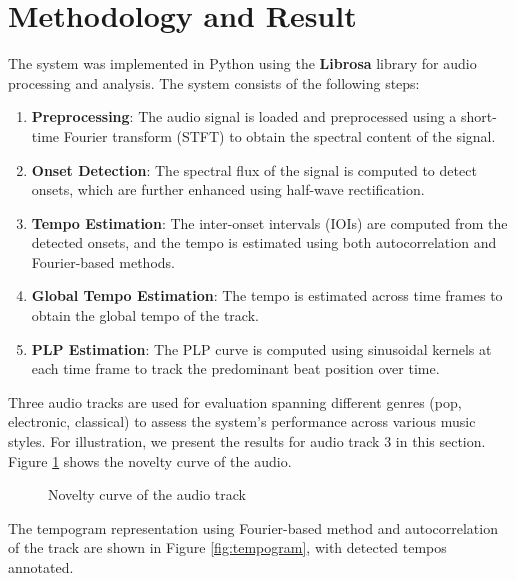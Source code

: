 \documentclass[
paper=A4,               %
pagesize=auto,          %
fontsize=12pt,          %
DIV=16,                 %
twoside=false,           %
BCOR=20mm,              %
parskip=false,          %
chapterprefix=true,     %
appendixprefix=true,    %
listof=totoc,           %
bibliography=totoc,     %
headinclude=true,       %
footinclude=false,      %
headsepline=false,       %
footsepline=false,      %
headings=small,         %
numbers=noenddot        %
] {scrbook}
\begin{document}
\section*{Methodology and Result}
The system was implemented in Python using the \textbf{Librosa} library for audio processing and analysis. The system consists of the following steps:
\begin{enumerate}
    \item \textbf{Preprocessing}: The audio signal is loaded and preprocessed using a short-time Fourier transform (STFT) to obtain the spectral content of the signal.
    \item \textbf{Onset Detection}: The spectral flux of the signal is computed to detect onsets, which are further enhanced using half-wave rectification.
    \item \textbf{Tempo Estimation}: The inter-onset intervals (IOIs) are computed from the detected onsets, and the tempo is estimated using both autocorrelation and Fourier-based methods.
    \item \textbf{Global Tempo Estimation}: The tempo is estimated across time frames to obtain the global tempo of the track.
    \item \textbf{PLP Estimation}: The PLP curve is computed using sinusoidal kernels at each time frame to track the predominant beat position over time.
\end{enumerate}
Three audio tracks are used for evaluation spanning different genres (pop, electronic, classical) to assess the system's performance across various music styles. For illustration, we present the results for audio track 3 in this section.
Figure \ref{fig:novelty} shows the novelty curve of the audio.
\begin{figure}[b]
    \centering
    \caption{Novelty curve of the audio track}
    \label{fig:novelty}
\end{figure}
The tempogram representation using Fourier-based method and autocorrelation of the track are shown in Figure \ref{fig:tempogram}, with detected tempos annotated.
\end{document}
